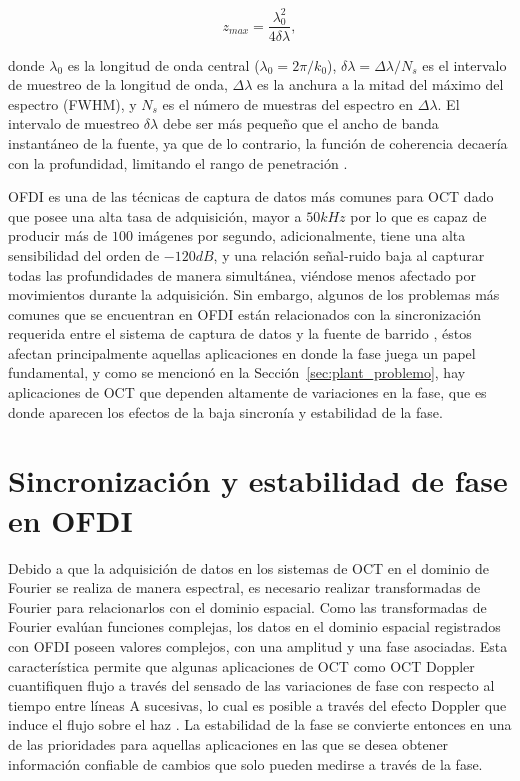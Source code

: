 
\begin{equation}
z_{max} = \frac{\lambda_0^2}{4\delta \lambda},
\end{equation}

\noindent donde $\lambda_0$ es la longitud de onda central ($\lambda_0 = 2\pi/k_0$), $\delta \lambda = \Delta\lambda/N_s$ es el intervalo de muestreo de la longitud de onda, $\Delta \lambda$ es la anchura a la mitad del máximo del espectro (FWHM), y $N_s$ es el número de muestras del espectro en $\Delta \lambda$. El intervalo de muestreo  $\delta \lambda$ debe ser más pequeño que el ancho de banda instantáneo de la fuente, ya que de lo contrario, la función de coherencia decaería con la profundidad, limitando el rango de penetración \cite{Drexler2015}.

OFDI es una de las técnicas de captura de datos más comunes para OCT \cite{Leitgeb2003,Choma2003} dado que posee una alta tasa de adquisición, mayor a $50kHz$ por lo que es capaz de producir más de $100$ imágenes por segundo, adicionalmente, tiene una alta sensibilidad del orden de $-120dB$, y una relación señal-ruido baja al capturar todas las profundidades de manera simultánea, viéndose menos afectado por movimientos durante la adquisición. Sin embargo, algunos de los problemas más comunes que se encuentran en OFDI están relacionados con la sincronización requerida entre el sistema de captura de datos y la fuente de barrido \cite{Vakoc2005}, éstos afectan principalmente aquellas aplicaciones en donde la fase juega un papel fundamental, y como se mencionó en la Sección~\ref{sec:plant_problemo}, hay aplicaciones de OCT que dependen altamente de variaciones en la fase, que es donde aparecen los efectos de la baja sincronía y estabilidad de la fase.

\section{Sincronización y estabilidad de fase en OFDI}
\label{sec:estabilidad_ofdi}

Debido a que la adquisición de datos en los sistemas de OCT en el dominio de Fourier se realiza de manera espectral, es necesario realizar transformadas de Fourier para relacionarlos con el dominio espacial. Como las transformadas de Fourier evalúan funciones complejas, los datos en el dominio espacial registrados con OFDI poseen valores complejos, con una amplitud y una fase asociadas. Esta característica permite que algunas aplicaciones de OCT como OCT Doppler cuantifiquen flujo a través del sensado de las variaciones de fase con respecto al tiempo entre líneas A sucesivas, lo cual es posible a través del efecto Doppler que induce el flujo sobre el haz \cite{Zhao2000}. La estabilidad de la fase se convierte entonces en una de las prioridades para aquellas aplicaciones en las que se desea obtener información confiable de cambios que solo pueden medirse a través de la fase. 


